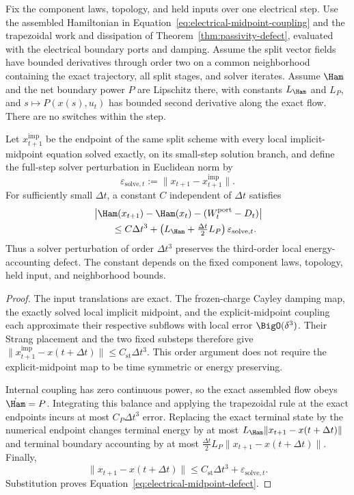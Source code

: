\begin{proposition}
\label{prop:electrical-midpoint-defect}
Fix the component laws, topology, and held inputs over one electrical step.
Use the assembled Hamiltonian in Equation~\eqref{eq:electrical-midpoint-coupling}
and the trapezoidal work and dissipation of
Theorem~\ref{thm:passivity-defect}, evaluated with the electrical boundary
ports and damping. Assume the split vector fields have bounded derivatives
through order two on a common neighborhood containing the exact trajectory,
all split stages, and solver iterates. Assume $\Ham$ and the net boundary
power $P$ are Lipschitz there, with constants $L_{\Ham}$ and $L_P$, and
$s\mapsto P(x(s),u_t)$ has bounded second derivative along the exact flow.
There are no switches within the step.

Let $x_{t+1}^{\mathrm{imp}}$ be the endpoint of the same split scheme with
every local implicit-midpoint equation solved exactly, on its small-step
solution branch, and define the full-step solver perturbation in Euclidean norm by
\[
 \varepsilon_{\mathrm{solve},t}
 :=\lVert x_{t+1}-x_{t+1}^{\mathrm{imp}}\rVert.
\]
For sufficiently small $\Delta t$, a constant $C$ independent of $\Delta t$
satisfies
\begin{equation}
\begin{aligned}
 &\left|\Ham(x_{t+1})-\Ham(x_t)
          -(W_t^{\mathrm{port}}-D_t)\right|\\
 &\qquad\le C\Delta t^3
       +\left(L_{\Ham}+\tfrac{\Delta t}{2}L_P\right)
          \varepsilon_{\mathrm{solve},t}.
\end{aligned}
\label{eq:electrical-midpoint-defect}
\end{equation}
Thus a solver perturbation of order $\Delta t^3$ preserves the third-order
local energy-accounting defect. The constant depends on the fixed component
laws, topology, held input, and neighborhood bounds.
\end{proposition}

\begin{proof}
The input translations are exact. The frozen-charge Cayley damping map,
the exactly solved local implicit midpoint, and the explicit-midpoint
coupling each approximate their respective subflows with local error
$\BigO(\delta^3)$. Their Strang placement and the two fixed substeps therefore
give $\lVert x_{t+1}^{\mathrm{imp}}-x(t+\Delta t)\rVert\le
C_{\mathrm{st}}\Delta t^3$. This order argument does not require the
explicit-midpoint map to be time symmetric or energy preserving.

Internal coupling has zero continuous power, so the exact assembled flow
obeys $\dot\Ham=P$. Integrating this balance and applying the trapezoidal
rule at the exact endpoints incurs at most $C_P\Delta t^3$ error.
Replacing the exact terminal state by the numerical endpoint changes
terminal energy by at most $L_{\Ham}\lVert x_{t+1}-x(t+\Delta t)\rVert$
and terminal boundary accounting by at most
$\tfrac{\Delta t}{2}L_P\lVert x_{t+1}-x(t+\Delta t)\rVert$.
Finally,
\[
 \lVert x_{t+1}-x(t+\Delta t)\rVert
 \le C_{\mathrm{st}}\Delta t^3+\varepsilon_{\mathrm{solve},t}.
\]
Substitution proves Equation~\eqref{eq:electrical-midpoint-defect}.
\end{proof}

